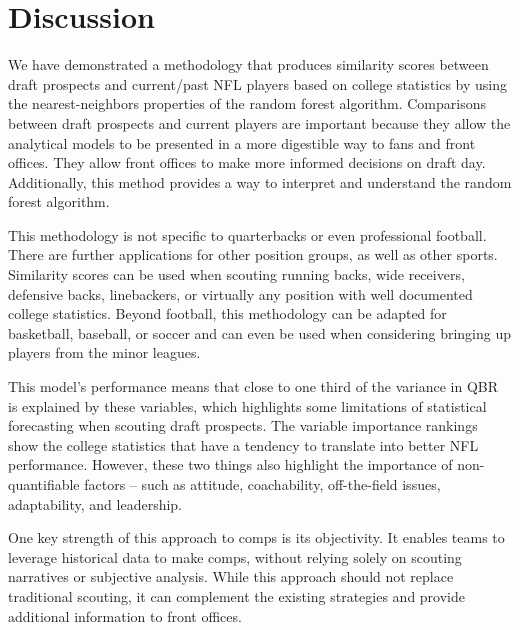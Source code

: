 \documentclass{article}
\begin{document}
\section{Discussion}
\label{sec:discussion}

We have demonstrated a methodology that produces similarity scores between draft prospects and current/past NFL players based on college statistics by using the nearest-neighbors properties of the random forest algorithm. Comparisons between draft prospects and current players are important because they allow the analytical models to be presented in a more digestible way to fans and front offices. They allow front offices to make more informed decisions on draft day. Additionally, this method provides a way to interpret and understand the random forest algorithm.

This methodology is not specific to quarterbacks or even professional football. There are further applications for other position groups, as well as other sports. Similarity scores can be used when scouting running backs, wide receivers, defensive backs, linebackers, or virtually any position with well documented college statistics. Beyond football, this methodology can be adapted for basketball, baseball, or soccer and can even be used when considering bringing up players from the minor leagues.

This model's performance means that close to one third of the variance in QBR is explained by these variables, which highlights some limitations of statistical forecasting when scouting draft prospects. The variable importance rankings show the college statistics that have a tendency to translate into better NFL performance. However, these two things also highlight the importance of non-quantifiable factors – such as attitude, coachability, off-the-field issues, adaptability, and leadership.

One key strength of this approach to comps is its objectivity. It enables teams to leverage historical data to make comps, without relying solely on scouting narratives or subjective analysis. While this approach should not replace traditional scouting, it can complement the existing strategies and provide additional information to front offices. 


\end{document}
